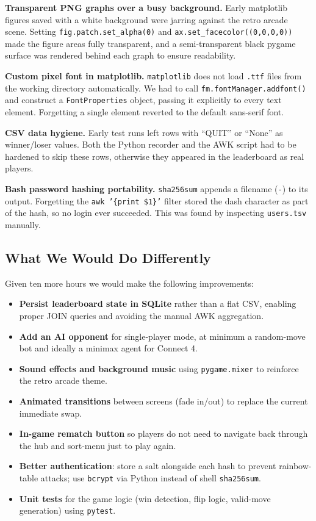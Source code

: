 \documentclass[12pt,a4paper]{article}
\begin{document}
\textbf{Transparent PNG graphs over a busy background.}
Early matplotlib figures saved with a white background were jarring against the
retro arcade scene. Setting \texttt{fig.patch.set\_alpha(0)} and
\texttt{ax.set\_facecolor((0,0,0,0))} made the figure areas fully transparent,
and a semi-transparent black pygame surface was rendered behind each graph to
ensure readability.
 
\textbf{Custom pixel font in matplotlib.}
\texttt{matplotlib} does not load \texttt{.ttf} files from the working directory
automatically. We had to call \texttt{fm.fontManager.addfont()} and construct
a \texttt{FontProperties} object, passing it explicitly to every text element.
Forgetting a single element reverted to the default sans-serif font.
 
\textbf{CSV data hygiene.}
Early test runs left rows with ``QUIT'' or ``None'' as winner/loser values.
Both the Python recorder and the AWK script had to be hardened to skip these
rows, otherwise they appeared in the leaderboard as real players.
 
\textbf{Bash password hashing portability.}
\texttt{sha256sum} appends a filename (\texttt{-}) to its output. Forgetting the
\texttt{awk '\{print \$1\}'} filter stored the dash character as part of the
hash, so no login ever succeeded. This was found by inspecting
\texttt{users.tsv} manually.
 
\subsection{What We Would Do Differently}
 
Given ten more hours we would make the following improvements:
 
\begin{itemize}[leftmargin=*]
  \item \textbf{Persist leaderboard state in SQLite} rather than a flat CSV,
        enabling proper JOIN queries and avoiding the manual AWK aggregation.
  \item \textbf{Add an AI opponent} for single-player mode, at minimum a
        random-move bot and ideally a minimax agent for Connect 4.
  \item \textbf{Sound effects and background music} using
        \texttt{pygame.mixer} to reinforce the retro arcade theme.
  \item \textbf{Animated transitions} between screens (fade in/out) to replace
        the current immediate swap.
  \item \textbf{In-game rematch button} so players do not need to navigate
        back through the hub and sort-menu just to play again.
  \item \textbf{Better authentication}: store a salt alongside each hash to
        prevent rainbow-table attacks; use \texttt{bcrypt} via Python instead
        of shell \texttt{sha256sum}.
  \item \textbf{Unit tests} for the game logic (win detection, flip logic,
        valid-move generation) using \texttt{pytest}.
\end{itemize}
 
\end{document}
